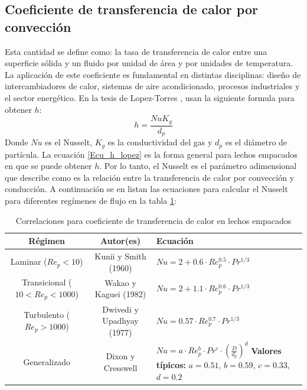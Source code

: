 \documentclass[12pt,letterpaper,final]{article}%
\begin{document}
\subsection{Coeficiente de transferencia de calor por convección}
Esta cantidad se define como: la tasa de transferencia de calor entre una superficie sólida y un fluido por unidad de área y por unidades de temperatura\cite{thermal2023conveccion}. La aplicación de este coeficiente es fundamental en distintas disciplinas: diseño de intercambiadores de calor, sistemas de aire acondicionado, procesos industriales y el sector energético.
En la tesis de Lopez-Torres \cite{Lopez2014}, usan la siguiente formula para obtener $h$:
\begin{equation}\label{Ecu_h_lopez}
	h = \frac{Nu K_g}{d_p}
\end{equation}
Donde $Nu$ es el Nusselt, $K_g$ es la conductividad del gas y $d_p$ es el diámetro de partícula.
\newline
La ecuación \ref{Ecu_h_lopez} es la forma general para lechos empacados en que se puede obtener $h$. Por lo tanto, el Nusselt es el parámetro adimensional que describe como es la relación entre la transferencia de calor por convección y conducción. A continuación se en listan las ecuaciones para calcular el Nusselt para diferentes regímenes de flujo en la tabla \ref{tab:correlaciones_Nu}:

\begin{table}[h]
	\centering
	\caption{Correlaciones para coeficiente de transferencia de calor en lechos empacados}
	\begin{tabular}{|c|c|p{6cm}|}
		\hline
		\textbf{Régimen} & \textbf{Autor(es)} & \textbf{Ecuación} \\ \hline
		Laminar ($Re_p < 10$) & Kunii y Smith (1960) \cite{kunii1960} & $Nu = 2 + 0.6 \cdot Re_p^{0.5} \cdot Pr^{1/3}$ \\ \hline
		Transicional ($10 < Re_p < 1000$) & Wakao y Kaguei (1982)\cite{wakao1982} & $Nu = 2 + 1.1 \cdot Re_p^{0.6} \cdot Pr^{1/3}$ \\ \hline
		Turbulento ($Re_p > 1000$) & Dwivedi y Upadhyay (1977)\cite{dwivedi1977} & $Nu = 0.57 \cdot Re_p^{0.7} \cdot Pr^{1/3}$ \\ \hline
		Generalizado & Dixon y Cresswell\cite{dixon1983} & 
		$Nu = a \cdot Re_p^b \cdot Pr^c \cdot \left( \frac{D}{d_p} \right)^d$ 
		\vspace{2mm} \newline 
		\textbf{Valores típicos:} $a=0.51$, $b=0.59$, $c=0.33$, $d=0.2$ \\ \hline
	\end{tabular}
	\label{tab:correlaciones_Nu}
\end{table}

\newpage
\printbibliography
\end{document}
